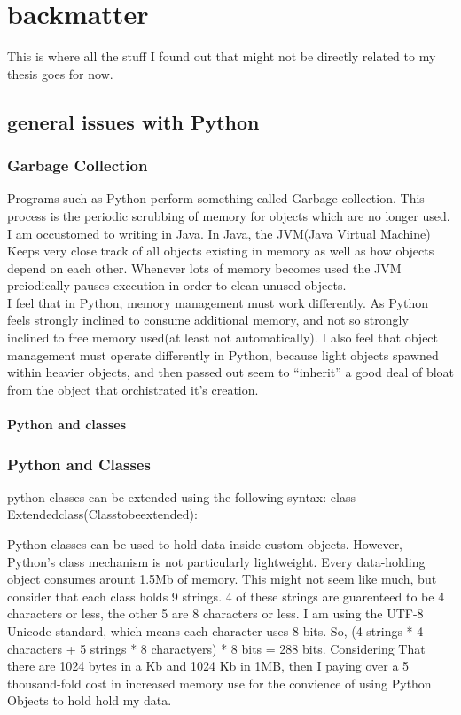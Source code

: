 \chapter{backmatter}

This is where all the stuff I found out that might not be directly related to my thesis goes for now.

\section{general issues with Python}

\subsection{Garbage Collection}

Programs such as Python perform something called Garbage collection.  This process is the periodic scrubbing of memory for objects which are no longer used.\\
I am occustomed to writing in Java.  In Java, the JVM(Java Virtual Machine) Keeps very close track of all objects existing in memory as well as how objects depend on each other.  Whenever lots of memory becomes used the JVM preiodically pauses execution in order to clean unused objects.\\
I feel that in Python, memory management must work differently.  As Python feels strongly inclined to consume additional memory, and not so strongly inclined to free memory used(at least not automatically).  I also feel that object management must operate differently in Python, because light objects spawned within heavier objects, and then passed out seem to ``inherit'' a good deal of bloat from the object that orchistrated it's creation.

\subsubsection{Python and classes}

\subsection{Python and Classes}

python classes can be extended using the following syntax:
    class Extendedclass(Classtobeextended):

Python classes can be used to hold data inside custom objects.  However, Python's class mechanism is not particularly lightweight.  Every data-holding object consumes arount 1.5Mb of memory.  This might not seem like much, but consider that each class holds 9 strings.  4 of these strings are guarenteed to be 4 characters or less, the other 5 are 8 characters or less.  I am using the UTF-8 Unicode standard, which means each character uses 8 bits.  So, (4 strings * 4 characters + 5 strings * 8 charactyers) * 8 bits = 288 bits.  Considering That there are 1024 bytes in a Kb and 1024 Kb in  1MB, then I paying over a 5 thousand-fold cost in increased memory use for the convience of using Python Objects to hold hold my data.

